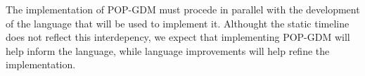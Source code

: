 The implementation of POP-GDM must procede in parallel with the
development of the language that will be used to implement
it. Althought the static timeline does not reflect this interdepency,
we expect that implementing POP-GDM will help inform the language,
while language improvements will help refine the implementation. 
